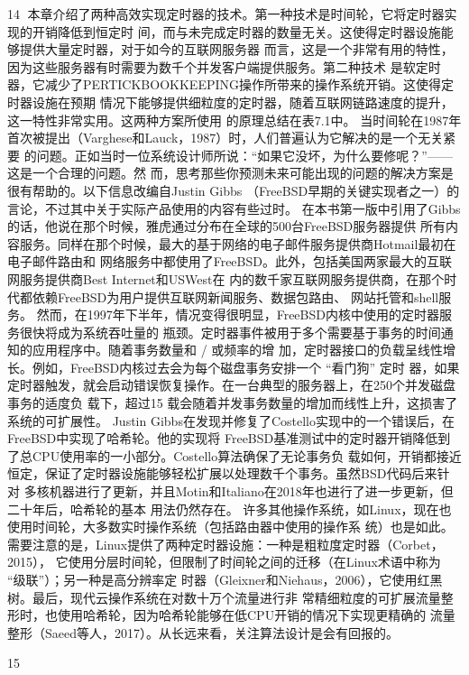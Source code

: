                                                         14
本章介绍了两种高效实现定时器的技术。第一种技术是时间轮，它将定时器实现的开销降低到恒定时
间，而与未完成定时器的数量无关。这使得定时器设施能够提供大量定时器，对于如今的互联网服务器
而言，这是一个非常有用的特性，因为这些服务器有时需要为数千个并发客户端提供服务。第二种技术
是软定时器，它减少了PERTICKBOOKKEEPING操作所带来的操作系统开销。这使得定时器设施在预期
情况下能够提供细粒度的定时器，随着互联网链路速度的提升，这一特性非常实用。这两种方案所使用
的原理总结在表7.1中。
当时间轮在1987年首次被提出（Varghese和Lauck，1987）时，人们普遍认为它解决的是一个无关紧要
的问题。正如当时一位系统设计师所说：“如果它没坏，为什么要修呢？”——这是一个合理的问题。然
而，思考那些你预测未来可能出现的问题的解决方案是很有帮助的。以下信息改编自Justin Gibbs
（FreeBSD早期的关键实现者之一）的言论，不过其中关于实际产品使用的内容有些过时。
在本书第一版中引用了Gibbs的话，他说在那个时候，雅虎通过分布在全球的500台FreeBSD服务器提供
所有内容服务。同样在那个时候，最大的基于网络的电子邮件服务提供商Hotmail最初在电子邮件路由和
网络服务中都使用了FreeBSD。此外，包括美国两家最大的互联网服务提供商Best Internet和USWest在
内的数千家互联网服务提供商，在那个时代都依赖FreeBSD为用户提供互联网新闻服务、数据包路由、
网站托管和shell服务。
然而，在1997年下半年，情况变得很明显，FreeBSD内核中使用的定时器服务很快将成为系统吞吐量的
瓶颈。定时器事件被用于多个需要基于事务的时间通知的应用程序中。随着事务数量和 / 或频率的增
加，定时器接口的负载呈线性增长。例如，FreeBSD内核过去会为每个磁盘事务安排一个 “看门狗” 定时
器，如果定时器触发，就会启动错误恢复操作。在一台典型的服务器上，在250个并发磁盘事务的适度负
载下，超过15%
载会随着并发事务数量的增加而线性上升，这损害了系统的可扩展性。
Justin Gibbs在发现并修复了Costello实现中的一个错误后，在FreeBSD中实现了哈希轮。他的实现将
FreeBSD基准测试中的定时器开销降低到了总CPU使用率的一小部分。Costello算法确保了无论事务负
载如何，开销都接近恒定，保证了定时器设施能够轻松扩展以处理数千个事务。虽然BSD代码后来针对
多核机器进行了更新，并且Motin和Italiano在2018年也进行了进一步更新，但二十年后，哈希轮的基本
用法仍然存在。
许多其他操作系统，如Linux，现在也使用时间轮，大多数实时操作系统（包括路由器中使用的操作系
统）也是如此。需要注意的是，Linux提供了两种定时器设施：一种是粗粒度定时器（Corbet，2015），
它使用分层时间轮，但限制了时间轮之间的迁移（在Linux术语中称为 “级联”）；另一种是高分辨率定
时器（Gleixner和Niehaus，2006），它使用红黑树。最后，现代云操作系统在对数十万个流量进行非
常精细粒度的可扩展流量整形时，也使用哈希轮，因为哈希轮能够在低CPU开销的情况下实现更精确的
流量整形（Saeed等人，2017）。从长远来看，关注算法设计是会有回报的。



                                                        15
